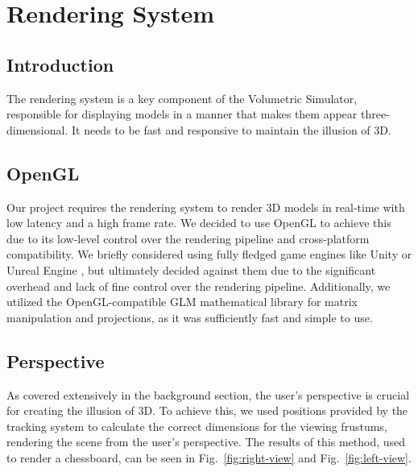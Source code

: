 \section{Rendering System}
\subsection{Introduction}
The rendering system is a key component of the Volumetric Simulator, responsible for displaying models in a manner that makes them appear three-dimensional. It needs to be fast and responsive to maintain the illusion of 3D.

\subsection{OpenGL}

Our project requires the rendering system to render 3D models in real-time with low latency and a high frame rate. We decided to use OpenGL \cite{woo1999opengl} to achieve this due to its low-level control over the rendering pipeline and cross-platform compatibility. We briefly considered using fully fledged game engines like Unity \cite{noauthor_unity_nodate} or Unreal Engine \cite{unrealengine}, but ultimately decided against them due to the significant overhead and lack of fine control over the rendering pipeline. Additionally, we utilized the OpenGL-compatible GLM \cite{noauthor_g-trucglm_2024} mathematical library for matrix manipulation and projections, as it was sufficiently fast and simple to use.

\subsection{Perspective}

As covered extensively in the background section, the user’s perspective is crucial for creating the illusion of 3D. To achieve this, we used positions provided by the tracking system to calculate the correct dimensions for the viewing frustums, rendering the scene from the user’s perspective. The results of this method, used to render a chessboard, can be seen in Fig.~\ref{fig:right-view} and Fig.~\ref{fig:left-view}.

